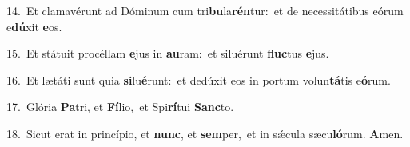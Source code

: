 {\numbfont\textcolor{\numbcolor}{14.}}~Et clamavérunt ad Dóminum cum tri\-\textbf{bu}\-la\-\textbf{rén}\-tur:~\star et de necessitátibus eórum e\-\textbf{dú}\-xit \textbf{e}\-os.\par
{\numbfont\textcolor{\numbcolor}{15.}}~Et státuit procéllam \textbf{e}\-jus in \textbf{au}\-ram:~\star et siluérunt \textbf{fluc}\-tus \textbf{e}\-jus.\par
{\numbfont\textcolor{\numbcolor}{16.}}~Et lætáti sunt quia \textbf{si}\-lu\-\textbf{é}\-runt:~\star et dedúxit eos in portum volun\-\textbf{tá}\-tis e\-\textbf{ó}\-rum.\par
{\numbfont\textcolor{\numbcolor}{17.}}~Glória \textbf{Pa}\-tri, et \textbf{Fí}\-lio,~\star et Spi\-\textbf{rí}\-tui \textbf{Sanc}\-to.\par
{\numbfont\textcolor{\numbcolor}{18.}}~Sicut erat in princípio, et \textbf{nunc}\-, et \textbf{sem}\-per,~\star et in sǽcula sæcu\-\textbf{ló}\-rum. \textbf{A}\-men.\par
